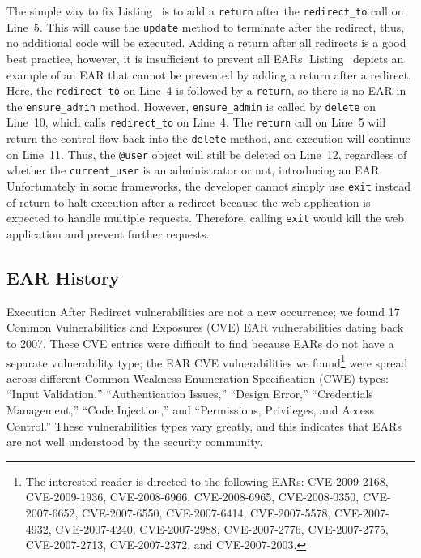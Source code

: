 The simple way to fix Listing~ is to add a
\texttt{return} after the \texttt{redirect\_to} call on Line~5. This will
cause the \texttt{update} method to terminate after the redirect, thus, no
additional code will be executed. Adding a return after all redirects is a
good best practice, however, it is insufficient to prevent all EARs.
Listing~ depicts an example of an EAR that cannot be
prevented by adding a return after a redirect. Here, the
\texttt{redirect\_to} on Line~4 is followed by a \texttt{return}, so there
is no EAR in the \texttt{ensure\_admin} method. However,
\texttt{ensure\_admin} is called by \texttt{delete} on Line~10, which calls
\texttt{redirect\_to} on Line~4. The \texttt{return} call on Line~5 will
return the control flow back into the \texttt{delete} method, and execution
will continue on Line~11. Thus, the \texttt{@user} object will still be
deleted on Line~12, regardless of whether the \texttt{current\_user} is an
administrator or not, introducing an EAR. Unfortunately in some frameworks,
the developer cannot simply use \texttt{exit} instead of return to halt
execution after a redirect because the web application is
expected to handle multiple requests. Therefore, calling \texttt{exit} would
kill the web application and prevent further requests.

\subsection{EAR History}
Execution After Redirect vulnerabilities are not a new occurrence; we found
17 Common Vulnerabilities and Exposures (CVE) EAR
vulnerabilities dating back to 2007. These CVE entries were difficult to
find because EARs do not have a separate vulnerability type; the EAR CVE
vulnerabilities we found\footnote{The interested reader is directed to the following
  EARs: CVE-2009-2168, CVE-2009-1936, CVE-2008-6966, CVE-2008-6965,
  CVE-2008-0350, CVE-2007-6652, CVE-2007-6550, CVE-2007-6414,
  CVE-2007-5578, CVE-2007-4932, CVE-2007-4240, CVE-2007-2988,
  CVE-2007-2776, CVE-2007-2775, CVE-2007-2713, CVE-2007-2372, and
  CVE-2007-2003.} were spread across different Common Weakness
Enumeration Specification (CWE) types: ``Input Validation,''
``Authentication Issues,'' ``Design Error,'' ``Credentials Management,''
``Code Injection,'' and ``Permissions, Privileges, and Access Control.''
These vulnerabilities types vary greatly, and this indicates that EARs are
not well understood by the security community.

